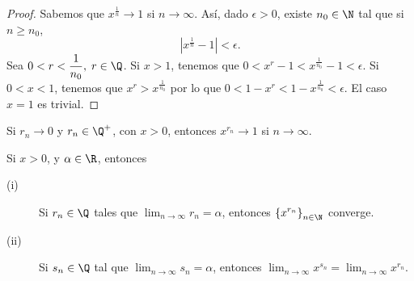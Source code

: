 \begin{proof}
Sabemos que $\displaystyle x^{\frac{1}{n}} \to 1 $ si $\displaystyle n \to \infty $. Así, dado $\displaystyle \epsilon > 0 $, existe $\displaystyle n_{0} \in \N $ tal que si $\displaystyle n \geq n_{0} $, 
\[ \left|x^{\frac{1}{n}}-1\right|< \epsilon  .\]
Sea $\displaystyle 0 < r < \frac{1}{n_{0}}, \; r \in \Q $. Si $\displaystyle x > 1 $, tenemos que $\displaystyle  0 < x^{r}-1 < x^{\frac{1}{n_{0}}}-1<\epsilon$. Si $\displaystyle 0 < x < 1 $, tenemos que $\displaystyle x^{r} > x^{\frac{1}{n_{0}}} $ por lo que $\displaystyle 0 < 1 - x^{r} < 1 - x^{\frac{1}{n_{0}}} < \epsilon  $. El caso $\displaystyle x = 1 $ es trivial. 
\end{proof}

\begin{fcolorary}[]
\normalfont Si $\displaystyle r_{n} \to 0 $ y $\displaystyle r_{n} \in \Q^{+} $, con $\displaystyle x > 0 $, entonces $\displaystyle x^{r_{n}} \to 1 $ si $\displaystyle n \to \infty $.
\end{fcolorary}

\begin{ftheorem}[]
\normalfont Si $\displaystyle x > 0 $, y $\displaystyle \alpha \in \R $, entonces
\begin{description}
	\item[(i)] Si $\displaystyle r_{n} \in\Q $ tales que $\displaystyle \lim_{n \to \infty}r_{n} = \alpha  $, entonces $\displaystyle \left\{ x^{r_{n}}\right\} _{n\in\N} $ converge. 
	\item[(ii)] Si $\displaystyle s_{n} \in \Q $ tal que $\displaystyle \lim_{n \to \infty}s_{n}=\alpha  $, entonces $\displaystyle \lim_{n \to \infty}x^{s_{n}} = \lim_{n \to \infty}x^{r_{n}} $.
\end{description}
\end{ftheorem}

